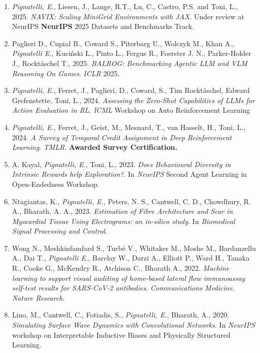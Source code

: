 \begin{publications}
    \begin{enumerate}[leftmargin=0.45cm, itemsep=0em, topsep=0.5em, parsep=0.2em]
        \item \emph{Pignatelli, E.}, Liesen, J., Lange, R.T., Lu, C., Castro, P.S. and Toni, L., 2025.\textit{ NAVIX: Scaling MiniGrid Environments with JAX}. Under review at NeurIPS \textbf{NeurIPS} 2025 Datasets and Benchmarks Track.
        \item Paglieri D., Cupiał B., Coward S., Piterbarg U., Wolczyk M., Khan A., \emph{Pignatelli E.}, Kuciński Ł., Pinto L., Fergus R., Foerster J. N., Parker-Holder J., Rocktäschel T., 2025. \textit{BALROG: Benchmarking Agentic LLM and VLM Reasoning On Games}. \emph{ICLR} 2025.
        \item \emph{Pignatelli, E.}, Ferret, J., Paglieri, D., Coward, S., Tim Rocktäschel, Edward Grefenstette, Toni, L., 2024. \textit{Assessing the Zero-Shot Capabilities of LLMs for Action Evaluation in RL}. \emph{ICML} Workshop on Auto Reinforcement Learning
        \item \emph{Pignatelli, E.}, Ferret, J., Geist, M., Mesnard, T., van Hasselt, H., Toni, L., 2024. \textit{A Survey of Temporal Credit Assignment in Deep Reinforcement Learning}. \emph{TMLR}. \textbf{Awarded Survey Certification.}
        \item A. Kayal, \emph{Pignatelli, E.}, Toni, L., 2023. \textit{Does Behavioural Diversity in Intrinsic Rewards help Exploration?}. In \emph{NeurIPS} Second Agent Learning in Open-Endedness Workshop.
        \item Ntagiantas, K., \emph{Pignatelli, E.}, Peters, N. S., Cantwell, C. D., Chowdhury, R. A., Bharath, A. A., 2023. \textit{Estimation of Fibre Architecture and Scar in Myocardial Tissue Using Electrograms: an in-silico study}. In \textit{Biomedical Signal Processing and Control}.
        \item Wong N., Meshkinfamfard S., Turbé V., Whitaker M., Moshe M., Bardanzellu A., Dai T., \emph{Pignatelli E.}, Barclay W., Darzi A., Elliott P., Ward H., Tanaka R., Cooke G., McKendry R., Atchison C., Bharath A., 2022. \textit{Machine learning to support visual auditing of home-based lateral flow immunoassay self-test results for SARS-CoV-2 antibodies}. \emph{Communications Medicine. Nature Research}.
        \item Lino, M., Cantwell, C., Fotiadis, S., \emph{Pignatelli, E.}, Bharath, A., 2020. \textit{Simulating Surface Wave Dynamics with Convolutional Networks}. In \emph{NeurIPS} workshop on Interpretable Inductive Biases and Physically Structured Learning.

\end{enumerate}
\end{publications}
